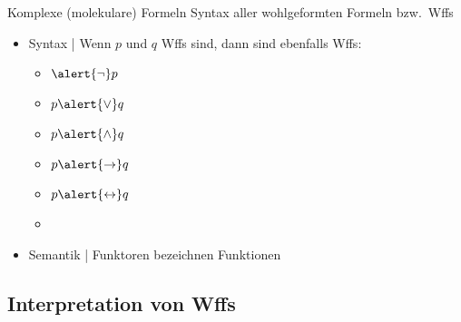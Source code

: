 \begin{frame}
  {Komplexe (molekulare) Formeln}
  \onslide<+->
  \onslide<+->
  Syntax aller \alert{wohlgeformten Formeln} bzw.\ \alert{Wffs}\\
  \Halbzeile
  \begin{itemize}[<+->]
    \item Syntax | Wenn $p$ und $q$ Wffs sind, dann sind ebenfalls Wffs:
      \Viertelzeile
      \begin{itemize}[<+->]
        \item<4-> $\alert{\neg}p$  
         \item<5-> $p\alert{\vee}q$  
         \item<6-> $p\alert{\wedge}q$  
         \item<7-> $p\alert{\rightarrow}q$  
         \item<8-> $p\alert{\leftrightarrow}q$  
         \item<8-> 
      \end{itemize}
      \Halbzeile
    \item<9-> Semantik | \alert{Funktoren} bezeichnen \alert{Funktionen}
  \end{itemize}
\end{frame}

\subsection{Interpretation von Wffs}

